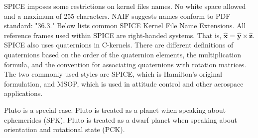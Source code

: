 \documentclass[crop=false,class=book]{standalone}
\begin{document}
            SPICE imposes some restrictions on kernel files names. No white space allowed and a maximum of 255 characters. NAIF suggests names conform to PDF standard: "36.3." Below lists common SPICE Kernel File Name Extensions. All reference frames used within SPICE are right-handed systems. That is, $\hat{\mathbf{x}} = \hat{\mathbf{y}}\times \hat{\mathbf{z}}$. SPICE also uses quaternions in C-kernels. There are different definitions of quaternions based on the order of the quaternion elements, the multiplication formula, and the convention for associating quaternions with rotation matrices. The two commonly used styles are SPICE, which is Hamilton's original formulation, and MSOP, which is used in attitude control and other aerospace applications.
            \begin{table}[H]
                \centering
                \caption{List of Kernel File Types}
                \label{tab:naif_list_of_kernel_file_types}
            \end{table}
            \begin{remark}
            Pluto is a special case. Pluto is treated as a planet when speaking about ephemerides (SPK). Pluto is treated as a dwarf planet when speaking about orientation and rotational state (PCK).
            \end{remark}
\end{document}
